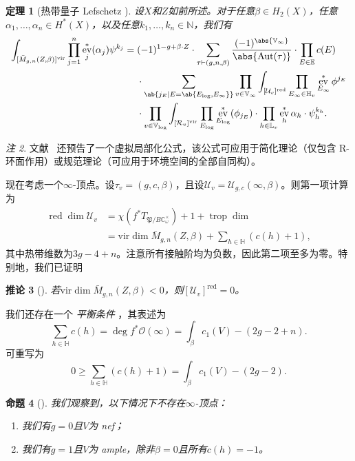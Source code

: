 \documentclass{amsart}
\newtheorem{thm}{定理}[section]
\newtheorem{cor}[thm]{推论}
\newtheorem{prop}[thm]{命题}
\theoremstyle{definition}
\theoremstyle{remark}
\newtheorem{rmk}[thm]{注}
\theoremstyle{plain}
\theoremstyle{definition}
\theoremstyle{remark}
\newcommand{\N}{\mathbb{N}}
\newcommand{\C}{\mathbb{C}}
\newcommand{\E}{\mathbb{E}}
\newcommand{\V}{\mathbb{V}}
\renewcommand{\H}{\mathbb{H}}
\renewcommand{\L}{\mathbb{L}}
\newcommand{\mc}[1]{\mathcal{#1}}
\newcommand{\mf}[1]{\mathfrak{#1}}
\newcommand{\mr}[1]{\mathrm{#1}}
\newcommand{\on}[1]{\operatorname{#1}}
\newcommand{\1}{\mathbf{1}}
\newcommand{\2}{\mathbf{2}}
\newcommand{\3}{\mathbf{3}}
\newcommand{\vir}{\mr{vir}}
\DeclareMathOperator{\Aut}{Aut}
\DeclareMathOperator{\ev}{ev}
\begin{document}
\begin{thm}[热带量子 Lefschetz {\cite{CJRtropical2025}}]
    设\(X\)和\(Z\)如前所述。对于任意\(\beta \in H_2(X)\)，任意\(\alpha_1, \ldots, \alpha_n \in H^*(X)\)，以及任意\(k_1, \ldots, k_n \in \N\)，我们有
    \begin{align*}
        \int_{[\bar{M}_{g,n}(Z,\beta)]^{\vir}} \prod_{j=1}^n \ev_j^* (\alpha_j) \psi^{k_j}={}& (-1)^{1-g+\beta \cdot Z} \cdot \sum_{\tau \vdash (g,n,\beta)} \frac{(-1)^{\abs{\V_{\infty}}}}{\abs{\Aut(\tau)}} \cdot \prod_{E \in \E} c(E) \\
        & \cdot \sum_{\ab\{j_E \mid E = \ab\{E_{\log}, E_{\infty}\}\}}  \prod_{v \in \V_{\infty}} \int_{[\mc{U}_v]^{\on{red}}} \prod_{E_{\infty} \in \H_v} \ev_{E_{\infty}}^* \phi^{j_E}  \\
        &  \cdot \prod_{v \in \V_{\log}} \int_{[\mc{R}_v]^{\vir}} \prod_{E_{\log}} \ev_{E_{\log}}^* (\phi_{j_E}) \cdot \prod_{h \in \L_v} \ev_h^* \alpha_h \cdot \psi_h^{k_h} .
    \end{align*}
\end{thm}

\begin{rmk}
文献~\cite{CJRlocalization} 还预告了一个虚拟局部化公式，该公式可应用于简化理论（仅包含 R-环面作用）或规范理论（可应用于环境空间的全部自同构）。
\end{rmk}

现在考虑一个\(\infty\)-顶点。设\(\tau_v = (g, c, \beta)\)，且设\(\mc{U}_v = \mc{U}_{g,c}(\infty, \beta)\)。则第一项计算为
\begin{align*}
    \on{red}\dim \mc{U}_v &= \chi(f^* T_{\mf{P}/B \C^{\times}_{\omega}}) + 1 + \on{trop}\dim  \\
    &= \vir\dim \bar{M}_{g,n}(Z, \beta) + \sum_{h \in \H } (c(h) + 1),
\end{align*}
其中热带维数为\(3g-4+n\)。注意所有接触阶均为负数，因此第二项至多为零。特别地，我们已证明
\begin{cor}[{\cite{CJRpunctured}}]
若\(\vir\dim \bar{M}_{g,n}(Z,\beta) < 0\)，则\([\mc{U}_v]^{\on{red}} = 0\)。
\end{cor}
我们还存在一个 \textit{ 平衡条件 }，其表述为
\begin{equation}\label{eqn:balancing condition}
    \sum_{h \in \H} c(h) = \deg f^* \mc{O}(\infty) = \int_{\beta} c_1(V) - (2g-2+n).
\end{equation}
可重写为
\[ 0 \geq \sum_{h \in \H} (c(h)+1) = \int_{\beta} c_1(V) - (2g-2). \]
\begin{prop}[{\cite{CJRpunctured}}]
我们观察到，以下情况下不存在\(\infty\)-顶点：
    \begin{enumerate}
\item 我们有\(g = 0\)且\(V\)为 nef；
\item 我们有\(g=1\)且\(V\)为 ample，除非\(\beta = 0\)且所有\(c(h) = -1\)。
    \end{enumerate}
\end{prop}
\end{document}
